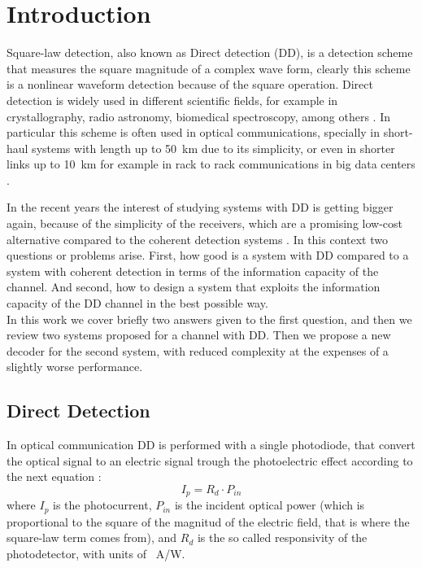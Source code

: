 \chapter{Introduction}
\label{ch:introduction}
\newcommand{\IntroImage}[1]{images/intro/#1}


	

Square-law detection, also known as Direct detection (DD), is a detection scheme that measures the square magnitude of a complex wave form, clearly this scheme is a nonlinear waveform detection because of the square operation. Direct detection is widely used in different scientific fields, for example in crystallography, radio astronomy, biomedical spectroscopy, among others \cite{Tasbihi_Tukey}. In particular this scheme is often used in optical communications, specially in short-haul systems with length up to \SI{50}{\km} \cite{Agrawal_ch1} due to its simplicity, or even in shorter links up to \SI{10}{\km} for example in rack to rack communications in big data centers \cite{Tasbihi_Tukey}.\\

In the recent years the interest of studying systems with DD is getting bigger again, because of the simplicity of the receivers, which are a promising low-cost alternative compared to the coherent detection systems \cite{Mecozzi_2018}. In this context two questions or problems arise. First, how good is a system with DD compared to a system with coherent detection in terms of the information capacity of the channel. And second, how to design a system that exploits the information capacity of the DD channel in the best possible way.\\

In this work we cover briefly two answers given to the first question, and then we review two systems proposed for a channel with DD. Then we propose a new decoder for the second system, with reduced complexity at the expenses of a slightly worse performance.




\section{Direct Detection}
\label{sec:Direct_Detection}

In optical communication DD is performed with a single photodiode, that convert the optical signal to an electric signal trough the photoelectric effect according to the next equation \cite{Agrawal_ch4}:
\begin{equation}
I_p = R_d\cdot P_{in}
\label{eq:photocurrent}
\end{equation}
where $I_p$ is the photocurrent, $P_{in}$ is the incident optical power (which is proportional to the square of the magnitud of the electric field, that is where the square-law term comes from), and $R_d$ is the so called responsivity of the photodetector, with units of \SI{}{\A/\W}.\\

